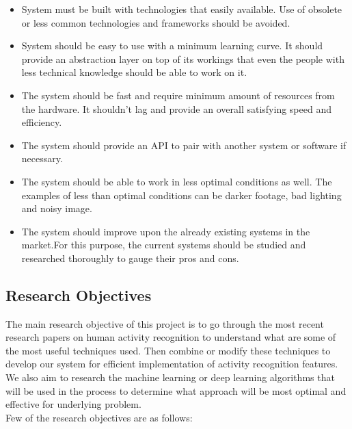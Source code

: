 \documentclass[11pt]{article}
\begin{document}
\begin{itemize}
\item System must be built with technologies that easily available. Use of obsolete or less common technologies and frameworks should be avoided. 
\item System should be easy to use with a minimum learning curve. It should provide an abstraction layer on top of its workings that even the people with less technical knowledge should be able to work on it. 
\item The system should be fast and require minimum amount of resources from the hardware. It shouldn't lag and provide an overall satisfying speed and efficiency. 
\item The system should provide an API to pair with another system or software if necessary.  
\item The system should be able to work in less optimal conditions as well. The examples of less than optimal conditions can be darker footage, bad lighting and noisy image. 
\item The system should improve upon the already existing systems in the market.For this purpose, the current systems should be studied and researched thoroughly to gauge their pros and cons. 

\end{itemize}

\subsection{\textbf{Research Objectives}}
 The main research objective of this project is to go through the most recent research papers on human activity recognition to understand what are some of the most useful techniques used. Then combine or modify these techniques to develop our system for efficient implementation of activity recognition features. We also aim to research the machine learning or deep learning algorithms that will be used in the process to determine what approach will be most optimal and effective for underlying problem.\\     
Few of the research objectives are as follows:
\end{document}
